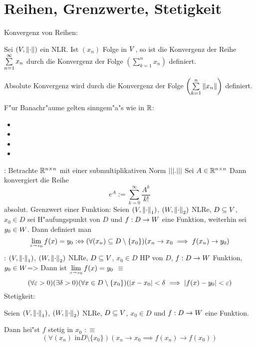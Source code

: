 \section{Reihen, Grenzwerte, Stetigkeit}
\lesserdefinition Konvergenz von Reihen:{
  Sei $(V,{\left\| \cdot\right\|})$ ein NLR. Ist $(x_n)$ Folge in $V$, so ist die 
  Konvergenz der Reihe $\sumn 1 x_n$ durch die Konvergenz der Folge
  $\left(\sum_{k=1}^n x_n\right)$ definiert.

  Absolute Konvergenz wird durch die Konvergenz der Folge 
  $\left(\sum_{k=1}^n \norm{x_n}\right)$ definiert.
  
  F"ur Banachr"aume gelten sinngem"a"s wie in $\mathbb R$:
  \begin{itemize}
    \item {}
    \item {}
    \item {}
    \item {}
    \end{itemize}
  }
\example:{
  Betrachte $\mathbb R^{n\times n}$ mit einer submultiplikativen Norm ${\left|\left|\left|.\right|\right|\right|}$
  Sei $A\in\mathbb R^{n\times n}$ Dann konvergiert die Reihe
  \[e^A:=\sum_{k=0}^\infty \frac{A^k}{k!}
    \]
  absolut.
  }
 Grenzwert einer Funktion:{
  Seien $(V,{\left\| \cdot\right\|}_1)$, $(W,{\left\| \cdot\right\|}_2)$ NLRe, $D\subseteq V$,
  $x_0\in D$ sei H"aufungspunkt von $D$ und $f:D\to W$ eine Funktion,
  weiterhin sei $y_0\in W$. Dann definiert man
  \[\limes x->{x_0} f(x)=y_0 :\equiv
    (\forall (x_n)\subseteq D\setminus \{x_0\})
    (x_n\to x_0\implies f(x_n)\to y_0)
    \]
  }
\theorem: 
  $(V,{\left\| \cdot\right\|}_1)$, $(W,{\left\| \cdot\right\|}_2)$ NLRe, $D\subseteq V$,
  $x_0\in D$ HP von $D$, $f:D\to W$ Funktion,
  $y_0\in W$=>{
  Dann ist $\limes x->{x_0} f(x)=y_0$ $\equiv$
  \[(\forall \varepsilon>0)(\exists \delta>0)(\forall x\in D\setminus\{x_0\})
    (|x-x_0|<\delta\implies |f(x)-y_0|<\varepsilon)
    \]
  }
 Stetigkeit:{
  Seien $(V,{\left\| \cdot\right\|}_1)$, $(W,{\left\| \cdot\right\|}_2)$ NLRe, $D\subseteq V$,
  $x_0\in D$ und $f:D\to W$ eine Funktion.
  
  Dann hei"st $f$ stetig in $x_0$ $:\equiv$
  \[(\forall (x_n) \text{ in} D\setminus \{x_0\})
    (x_n\to x_0\implies f(x_n)\to f(x_0))
    \]
}
